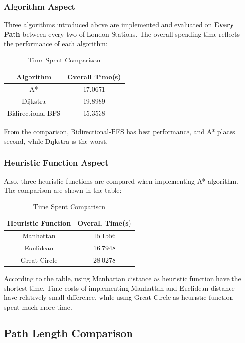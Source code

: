 \documentclass{article}
\begin{document}
	\subsubsection*{Algorithm Aspect}
	Three algorithms introduced above are implemented and evaluated on \textbf{Every Path} between every two of London Stations. The overall spending time reflects the performance of each algorithm:
	\begin{table}[H]
		\centering
		\caption{Time Spent Comparison}
		\begin{tabular}{cc}
			\toprule
			Algorithm & Overall Time(s) \\
			\midrule
			A* &  17.0671 \\
			Dijkstra & 19.8989 \\
			Bidirectional-BFS & 15.3538  \\
			\bottomrule
		\end{tabular}
	\end{table}
	From the comparison, Bidirectional-BFS has best performance, and A* places second, while Dijkstra is the worst.
	
	\subsubsection*{Heuristic Function Aspect}
	Also, three heuristic functions are compared when implementing A* algorithm. The comparison are shown in the table:
	\begin{table}[H]
		\centering
		\caption{Time Spent Comparison}
		\begin{tabular}{cc}
			\toprule
			Heuristic Function & Overall Time(s) \\
			\midrule
			Manhattan &  15.1556 \\
			Euclidean & 16.7948 \\
			Great Circle &  28.0278 \\
			\bottomrule
		\end{tabular}
	\end{table}
	According to the table, using Manhattan distance as heuristic function have the shortest time. Time costs of implementing Manhattan and Euclidean distance 
	have relatively small difference, while using Great Circle as heuristic function spent much more time.
		
	\subsection*{Path Length Comparison}
\end{document}
